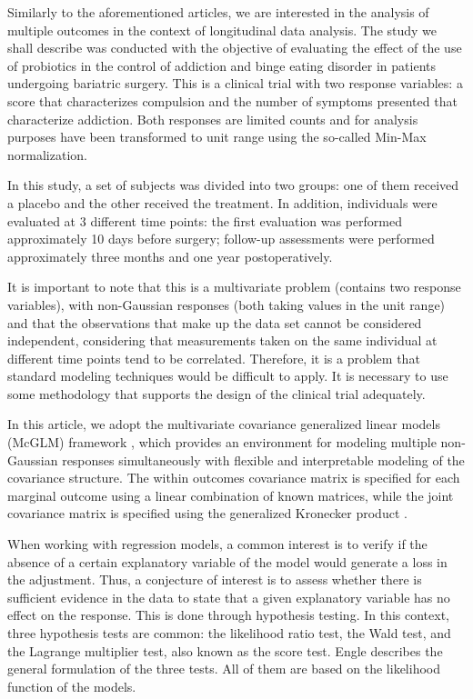 \documentclass[Review,sagev,times, doublespace]{sagej}
\begin{document}

Similarly to the aforementioned articles, we are interested in the analysis of multiple outcomes in the context of longitudinal data analysis. The study we shall describe was conducted with the objective of evaluating the effect of the use of probiotics in the control of addiction and binge eating disorder in patients undergoing bariatric surgery. This is a clinical trial with two response variables: a score that characterizes compulsion and the number of symptoms presented that characterize addiction. Both responses are limited counts and for analysis purposes have been transformed to unit range using the so-called Min-Max normalization.

In this study, a set of subjects was divided into two groups: one of them received a placebo and the other received the treatment. In addition, individuals were evaluated at 3 different time points: the first evaluation was performed approximately 10 days before surgery; follow-up assessments were performed approximately three months and one year postoperatively.


It is important to note that this is a multivariate problem (contains two response variables), with non-Gaussian responses (both taking values in the unit range) and that the observations that make up the data set cannot be considered independent, considering that measurements taken on the same individual at different time points tend to be correlated. Therefore, it is a problem that standard modeling techniques would be difficult to apply. It is necessary to use some methodology that supports the design of the clinical trial adequately.

In this article, we adopt the multivariate covariance generalized linear models (McGLM) framework \cite{Bonat16}, which provides an environment for modeling multiple non-Gaussian responses simultaneously with flexible and interpretable modeling of the covariance structure. The within outcomes covariance matrix is specified for each marginal outcome using a linear combination of known matrices, while the joint covariance matrix is specified using the generalized Kronecker product \cite{martinez13,Bonat16}.


When working with regression models, a common interest is to verify if the absence of a certain explanatory variable of the model would generate a loss in the adjustment. Thus, a conjecture of interest is to assess whether there is sufficient evidence in the data to state that a given explanatory variable has no effect on the response. This is done through hypothesis testing. In this context, three hypothesis tests are common: the likelihood ratio test, the Wald test, and the Lagrange multiplier test, also known as the score test. Engle \cite{engle} describes the general formulation of the three tests. All of them are based on the likelihood function of the models. 
\end{document}
